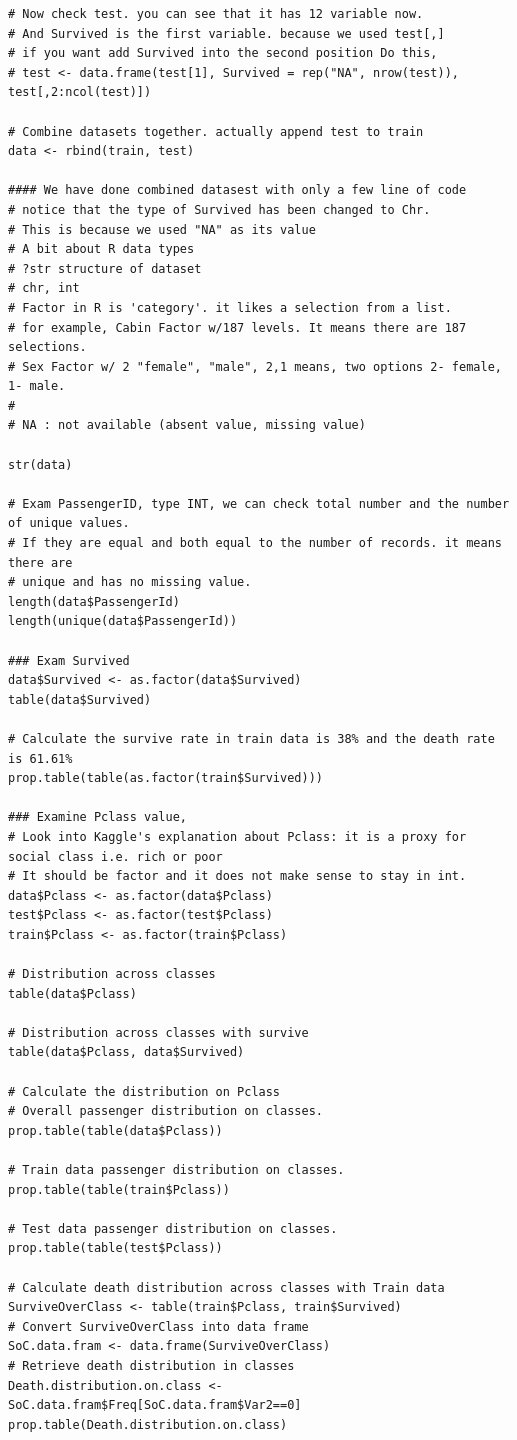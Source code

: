\documentclass[
]{book}
\begin{document}
\begin{verbatim}
# Now check test. you can see that it has 12 variable now.
# And Survived is the first variable. because we used test[,]
# if you want add Survived into the second position Do this,
# test <- data.frame(test[1], Survived = rep("NA", nrow(test)), test[,2:ncol(test)])

# Combine datasets together. actually append test to train
data <- rbind(train, test)

#### We have done combined datasest with only a few line of code
# notice that the type of Survived has been changed to Chr.
# This is because we used "NA" as its value
# A bit about R data types
# ?str structure of dataset
# chr, int
# Factor in R is 'category'. it likes a selection from a list.
# for example, Cabin Factor w/187 levels. It means there are 187 selections.
# Sex Factor w/ 2 "female", "male", 2,1 means, two options 2- female, 1- male.
#
# NA : not available (absent value, missing value)

str(data)

# Exam PassengerID, type INT, we can check total number and the number of unique values.
# If they are equal and both equal to the number of records. it means there are
# unique and has no missing value.
length(data$PassengerId)
length(unique(data$PassengerId))

### Exam Survived
data$Survived <- as.factor(data$Survived)
table(data$Survived)

# Calculate the survive rate in train data is 38% and the death rate is 61.61%
prop.table(table(as.factor(train$Survived)))

### Examine Pclass value,
# Look into Kaggle's explanation about Pclass: it is a proxy for social class i.e. rich or poor
# It should be factor and it does not make sense to stay in int.
data$Pclass <- as.factor(data$Pclass)
test$Pclass <- as.factor(test$Pclass)
train$Pclass <- as.factor(train$Pclass)

# Distribution across classes
table(data$Pclass)

# Distribution across classes with survive
table(data$Pclass, data$Survived)

# Calculate the distribution on Pclass
# Overall passenger distribution on classes.
prop.table(table(data$Pclass))

# Train data passenger distribution on classes.
prop.table(table(train$Pclass))

# Test data passenger distribution on classes.
prop.table(table(test$Pclass))

# Calculate death distribution across classes with Train data
SurviveOverClass <- table(train$Pclass, train$Survived)
# Convert SurviveOverClass into data frame
SoC.data.fram <- data.frame(SurviveOverClass)
# Retrieve death distribution in classes
Death.distribution.on.class <- SoC.data.fram$Freq[SoC.data.fram$Var2==0]
prop.table(Death.distribution.on.class)


\end{verbatim}
\end{document}
